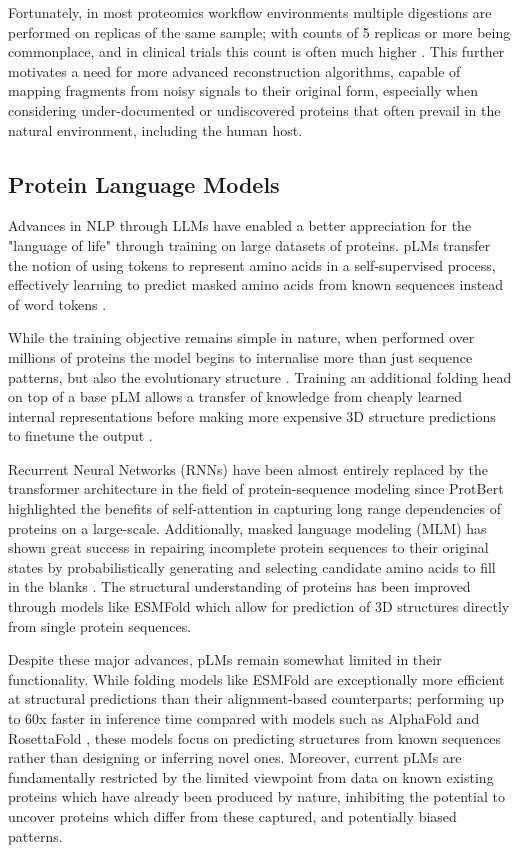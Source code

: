\documentclass[journal]{IEEEtran}
\begin{document}
Fortunately, in most proteomics workflow environments multiple digestions are performed on replicas of the 
same sample; with counts of 5 replicas or more being commonplace, and in clinical trials this count is
often much higher \cite{10.3389/fgene.2015.00360}.
This further motivates a need for more advanced reconstruction
algorithms, capable of mapping fragments from noisy signals to their original form, especially when
considering under-documented or undiscovered proteins that often prevail in the natural environment, including the human host.

\subsection{Protein Language Models}
Advances in NLP through LLMs have enabled a 
better appreciation for the "language of life" \cite{9477085}
through training on large datasets of proteins. pLMs transfer the notion of using
tokens to represent amino acids in a self-supervised process, effectively learning to predict
masked amino acids from known sequences instead of word tokens \cite{9477085}.

While the training objective remains simple in nature, when performed over millions of proteins
the model begins to internalise more than just sequence patterns, but also the evolutionary structure
\cite{lin2023esmfold}. Training an additional folding head on top of a base pLM allows a transfer
of knowledge from cheaply learned internal representations before making more expensive 3D structure predictions
to finetune the output \cite{lin2023esmfold}.

Recurrent Neural Networks (RNNs) have been almost entirely replaced by the transformer architecture
in the field of protein-sequence modeling since ProtBert \cite{9477085} highlighted the benefits 
of self-attention in capturing long range dependencies of proteins on a large-scale. Additionally, masked language modeling
(MLM) has shown great success in repairing incomplete protein sequences to their original states by probabilistically generating
and selecting candidate amino acids to fill in the blanks \cite{9477085}. The structural understanding
of proteins has been improved through models like ESMFold \cite{lin2023esmfold} which allow for
prediction of 3D structures directly from single protein sequences.

Despite these major advances, pLMs remain somewhat limited in their functionality. While folding models like ESMFold are
exceptionally more efficient at structural predictions than their alignment-based counterparts; performing up to
60x faster in inference time compared with models such as AlphaFold and RosettaFold \cite{lin2023esmfold}, these models
focus on predicting structures from known sequences rather than designing or inferring novel ones. Moreover,
current pLMs are fundamentally restricted by the limited viewpoint from data on known existing proteins 
which have already been produced by nature, inhibiting the potential to uncover proteins which differ
from these captured, and potentially biased patterns.
\end{document}

